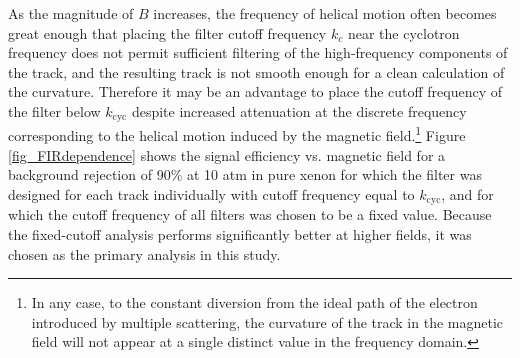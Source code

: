 \documentclass{JINST}
\begin{document}
As the magnitude of $B$ increases, the frequency of helical motion often becomes great enough that placing the 
filter cutoff frequency $k_{c}$ near the cyclotron frequency does not permit sufficient filtering of the 
high-frequency components of the track, and the resulting track is not smooth enough for a clean calculation of 
the curvature.  Therefore it may be an advantage to place the cutoff frequency of the filter below 
$k_{\mathrm{cyc}}$ despite increased attenuation at the discrete frequency corresponding to the helical motion 
induced by the magnetic field.\footnote{In any case, to the constant diversion from the ideal path of the electron
introduced by multiple scattering, the curvature of the track in the magnetic field will not appear at a single 
distinct value in the frequency domain.}  Figure \ref{fig_FIRdependence} shows the signal efficiency vs. magnetic
field for a background rejection of 90\% at 10 atm in pure xenon for which the filter was designed for each track 
individually with cutoff frequency equal to $k_{\mathrm{cyc}}$, and for which the cutoff frequency of all filters 
was chosen to be a fixed value.  
Because the fixed-cutoff analysis performs significantly better at higher fields, it was chosen as the primary 
analysis in this study.

\end{document}
